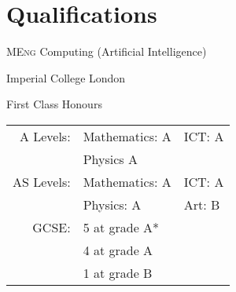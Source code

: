 \section{Qualifications}

\textsc{MEng} Computing (Artificial Intelligence)

Imperial College London

First Class Honours

\begin{tabular}{rll}	

A Levels: & Mathematics: A & ICT: A\\ &Physics A&\\
AS Levels: & Mathematics: A & ICT: A\\
 & Physics: A & Art: B\\
GCSE: & 5 at grade A* &\\
&4 at grade A&\\
&1 at grade B&

\end{tabular}
